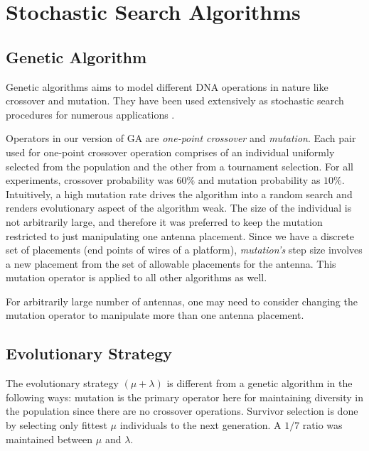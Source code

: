 \documentclass[conference]{IEEEtran}
\begin{document}
\section{Stochastic Search Algorithms}
\label{sec:algorithms}
\subsection{Genetic Algorithm}
\label{sec:algorithms-ga}
Genetic algorithms aims to model different DNA operations in nature like crossover and mutation. They have been used extensively as stochastic search procedures for numerous applications \cite{fogel1994}.

Operators in our version of GA are \textit{one-point crossover} and \textit{mutation}. Each pair used for one-point crossover operation comprises of an individual uniformly selected from the population and the other from a tournament selection. For all experiments, crossover probability was $60\%$ and mutation probability as $10\%$. Intuitively, a high mutation rate drives the algorithm into a random search and renders evolutionary aspect of the algorithm weak. The size of the individual is not arbitrarily large, and therefore it was preferred to keep the mutation restricted to just manipulating one antenna placement. Since we have a discrete set of placements (end points of wires of a platform), \textit{mutation's} step size involves a new placement from the set of allowable placements for the antenna. This mutation operator is applied to all other algorithms as well.

For arbitrarily large number of antennas, one may need to consider changing the mutation operator to manipulate more than one antenna placement. 
\subsection{Evolutionary Strategy}
\label{sec:algorithms-es}
The evolutionary strategy $(\mu + \lambda)$ is different from a genetic algorithm in the following ways: 
mutation is the primary operator here for maintaining diversity in the population since there are no crossover operations. Survivor selection is done by selecting only fittest $\mu$ individuals to the next generation. A $1/7$ ratio was maintained between $\mu$ and $\lambda$. 
\end{document}
